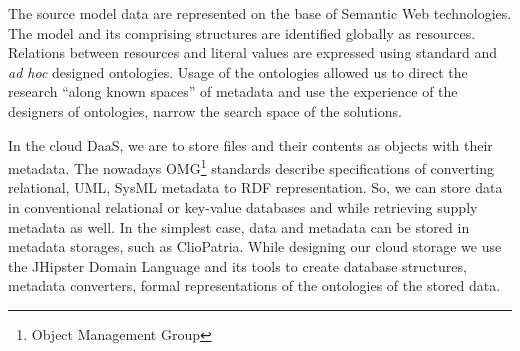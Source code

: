 \documentclass[a4paper]{jpconf}
\begin{document}
The source model data are represented on the base of Semantic Web technologies.  The model and its comprising structures are identified globally as resources.  Relations between resources and literal values are expressed using standard and \emph{ad hoc} designed ontologies.  Usage of the ontologies allowed us to direct the research ``along known spaces'' of metadata and use the experience of the designers of ontologies, narrow the search space of the solutions.


In the cloud DaaS, we are to store files and their contents as objects with their metadata.  The nowadays OMG\footnote{Object Management Group} standards describe specifications of converting relational, UML, SysML metadata to RDF representation.  So, we can store data in conventional relational or key-value databases and while retrieving supply metadata as well.  In the simplest case, data and metadata can be stored in metadata storages, such as ClioPatria.  While designing our cloud storage we use the JHipster Domain Language \cite{jhipster} and its tools to create database structures, metadata converters, formal representations of the ontologies of the stored data.

\end{document}
